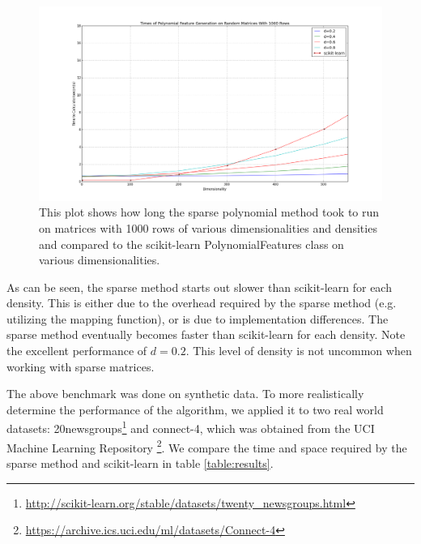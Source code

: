 \documentclass[11pt,onecolumn]{article}
\begin{document}
\begin{figure}[ht!, numbered]
    \includegraphics[scale=0.3]{benchmark_results.png}
    \caption{This plot shows how long the sparse polynomial method took to run on matrices with 1000 rows of various dimensionalities and densities and compared to the scikit-learn PolynomialFeatures class on various dimensionalities.}
    \label{fig:benchmark}
    \centering
\end{figure}

As can be seen, the sparse method starts out slower than scikit-learn for each density. This
is either due to the overhead required by the sparse method (e.g. utilizing the mapping function),
or is due to implementation differences. The sparse method eventually becomes faster than scikit-learn
for each density. Note the excellent performance of $d=0.2$. This level of density is not uncommon when
working with sparse matrices.

The above benchmark was done on synthetic data. To more realistically determine the performance of
the algorithm, we applied it to two real world datasets: 20newsgroups\footnote{\url{http://scikit-learn.org/stable/datasets/twenty_newsgroups.html}} and connect-4, which was obtained
from the UCI Machine Learning Repository \cite{Lichman:2013}\footnote{\url{https://archive.ics.uci.edu/ml/datasets/Connect-4}}. We compare the time and space required by the sparse method and scikit-learn in table \eqref{table:results}.
\end{document}
